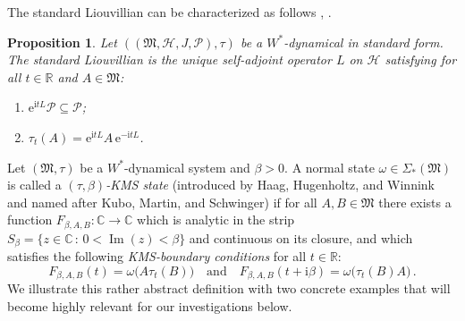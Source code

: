 \documentclass[a4paper, twoside, 11pt, reqno]{amsart}
\theoremstyle{definition}
\theoremstyle{plain}
\newtheorem{proposition}[definition]{Proposition}
\renewcommand{\subset}{\subseteq}
\renewcommand{\Im}{\operatorname{Im}}
\renewcommand{\Sigma}{\varSigma}
\newcommand{\R}{\mathbb{R}}
\newcommand{\C}{\mathbb{C}}
\newcommand{\MH}{\mathcal{H}}
\newcommand{\MFM}{\mathfrak{M}}
\newcommand{\ii}{\mathrm{i}}
\newcommand{\ee}{\mathrm{e}}
\newcommand{\NS}[1]{\Sigma_{\ast}(#1)}
\newcommand{\NPC}{\mathcal{P}}
\newcommand{\1}{\mathbf{1}}
\newcommand{\set}[2][]{#1\{{#2}#1\}}
\newcommand{\tand}{\quad\text{and}\quad}
\begin{document}
The standard Liouvillian can be characterized as follows \cite[Thm. 2.9]{DJP03}, \cite[Prop. 4.46]{Pillet2006}.

\begin{proposition}\label{pro:standardLiouvillian}
    Let $((\MFM, \MH, J, \NPC), \tau)$ be a $W^\ast$-dynamical in standard form. The standard Liouvillian is the unique self-adjoint operator $L$ on $\MH$ satisfying for all $t \in \R$ and $A \in \MFM$:
    \begin{enumerate}
        \item $\ee^{\ii t L} \NPC \subset \NPC$;
        \item $\tau_t(A) = \ee^{\ii t L} A \, \ee^{- \ii t L}$.
    \end{enumerate}
\end{proposition}

Let $(\MFM, \tau)$ be a $W^\ast$-dynamical system and $\beta > 0$. A normal state $\omega \in \NS{\MFM}$ is called a \emph{$(\tau, \beta)$-KMS state} (introduced by Haag, Hugenholtz, and Winnink \cite{Haag1967} and named after Kubo, Martin, and Schwinger) if for all $A, B \in \MFM$ there exists a function $F_{\beta, A, B} : \C \to \C$ which is analytic in the strip $S_\beta = \set{z \in \C \, : \, 0 < \Im(z) < \beta}$ and continuous on its closure, and which satisfies the following \emph{KMS-boundary conditions} for all $t \in \R$:
\begin{equation*}
    F_{\beta, A, B}(t) = \omega\bigl(A \tau_t(B)\bigr) \tand F_{\beta, A, B}(t + \ii \beta) = \omega\bigl(\tau_t(B) A\bigr) \, .
\end{equation*}
We illustrate this rather abstract definition with two concrete examples that will become highly relevant for our investigations below.
\end{document}
